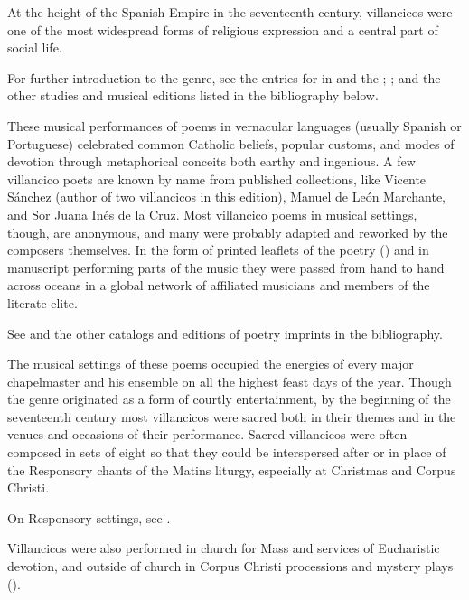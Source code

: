 At the height of the Spanish Empire in the seventeenth century,
villancicos were one of the most widespread forms of religious expression and a 
central part of social life.%
\begin{Footnote}
    For further introduction to the genre, see the entries for 
    in  and the ;
    \autocites{Laird:VC}{Knighton-Torrente:VCs}
    [42--50, 55--56]{Laird:CatholicChurchMusic18C};
    and the other studies and musical editions listed in the bibliography below.
\end{Footnote}
These musical performances of poems in vernacular languages (usually Spanish or
Portuguese) celebrated common Catholic beliefs, popular customs, and modes of
devotion through metaphorical conceits both earthy and ingenious.
A few villancico poets are known by name from published collections, like
Vicente Sánchez (author of two villancicos in this edition), Manuel de León
Marchante, and Sor Juana Inés de la Cruz. 
Most villancico poems in musical settings, though, are anonymous, and many were
probably adapted and reworked by the composers themselves.
In the form of printed leaflets of the poetry () and in 
manuscript performing parts of the music they were passed from hand to hand 
across oceans in a global network of affiliated musicians and members of the 
literate elite.%
\begin{Footnote}
    See \autocite{BNE:VCs17C} and the other catalogs and editions of poetry
    imprints in the bibliography.
\end{Footnote}

The musical settings of these poems occupied the energies of every major 
chapelmaster and his ensemble on all the highest feast days of the year.
Though the genre originated as a form of courtly entertainment, by the 
beginning of the seventeenth century most villancicos were sacred both in their 
themes and in the venues and occasions of their performance.
Sacred villancicos were often composed in sets of eight so that they could be 
interspersed after or in place of the Responsory chants of the Matins liturgy, 
especially at Christmas and Corpus Christi.%
\begin{Footnote}
    On Responsory settings, see \autocite{Goldman:Responsory}.
\end{Footnote}
Villancicos were also performed in church for Mass and services of Eucharistic
devotion, and outside of church in Corpus Christi processions and mystery plays
().

